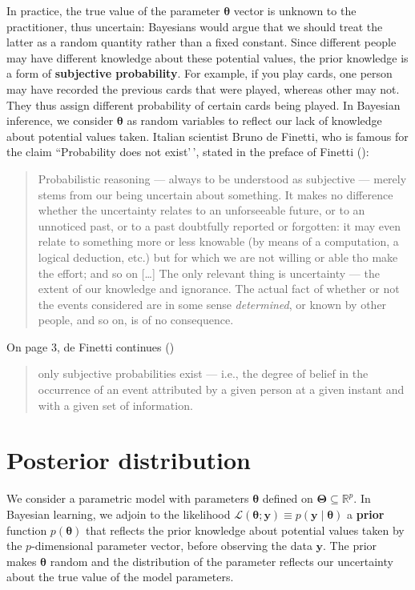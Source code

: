 \documentclass[
  11pt,
  letterpaper,
]{scrbook}
\theoremstyle{definition}
\theoremstyle{definition}
\theoremstyle{definition}
\theoremstyle{plain}
\theoremstyle{plain}
\theoremstyle{remark}
\begin{document}
In practice, the true value of the parameter \(\boldsymbol{\theta}\)
vector is unknown to the practitioner, thus uncertain: Bayesians would
argue that we should treat the latter as a random quantity rather than a
fixed constant. Since different people may have different knowledge
about these potential values, the prior knowledge is a form of
\textbf{subjective probability}. For example, if you play cards, one
person may have recorded the previous cards that were played, whereas
other may not. They thus assign different probability of certain cards
being played. In Bayesian inference, we consider \(\boldsymbol{\theta}\)
as random variables to reflect our lack of knowledge about potential
values taken. Italian scientist Bruno de Finetti, who is famous for the
claim ``Probability does not exist'\,', stated in the preface of Finetti
():

\begin{quote}
Probabilistic reasoning --- always to be understood as subjective ---
merely stems from our being uncertain about something. It makes no
difference whether the uncertainty relates to an unforseeable future, or
to an unnoticed past, or to a past doubtfully reported or forgotten: it
may even relate to something more or less knowable (by means of a
computation, a logical deduction, etc.) but for which we are not willing
or able tho make the effort; and so on {[}\ldots{]} The only relevant
thing is uncertainty --- the extent of our knowledge and ignorance. The
actual fact of whether or not the events considered are in some sense
\emph{determined}, or known by other people, and so on, is of no
consequence.
\end{quote}

On page 3, de Finetti continues ()

\begin{quote}
only subjective probabilities exist --- i.e., the degree of belief in
the occurrence of an event attributed by a given person at a given
instant and with a given set of information.
\end{quote}

\section{Posterior distribution}\label{posterior-distribution}

We consider a parametric model with parameters \(\boldsymbol{\theta}\)
defined on \(\boldsymbol{\Theta} \subseteq \mathbb{R}^p\). In Bayesian
learning, we adjoin to the likelihood
\(\mathcal{L}(\boldsymbol{\theta}; \boldsymbol{y}) \equiv p(\boldsymbol{y} \mid \boldsymbol{\theta})\)
a \textbf{prior} function \(p(\boldsymbol{\theta})\) that reflects the
prior knowledge about potential values taken by the \(p\)-dimensional
parameter vector, before observing the data \(\boldsymbol{y}\). The
prior makes \(\boldsymbol{\theta}\) random and the distribution of the
parameter reflects our uncertainty about the true value of the model
parameters.
\end{document}
